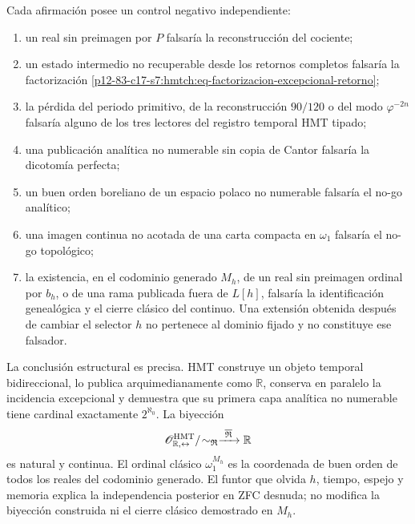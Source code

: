\begin{proposition}[Falsadores]
\label{p12-83-c19-s1:hmtch:prop-falsadores}
Cada afirmación posee un control negativo independiente:
\begin{enumerate}
 \item un real sin preimagen por \(P\) falsaría la reconstrucción del
       cociente;
 \item un estado intermedio no recuperable desde los retornos completos
       falsaría la factorización
       \eqref{p12-83-c17-s7:hmtch:eq-factorizacion-excepcional-retorno};
 \item la pérdida del periodo primitivo, de la reconstrucción \(90/120\) o
       del modo \(\varphi^{-2n}\) falsaría alguno de los tres lectores del
       registro temporal HMT tipado;
 \item una publicación analítica no numerable sin copia de Cantor falsaría
       la dicotomía perfecta;
 \item un buen orden boreliano de un espacio polaco no numerable falsaría el
       no-go analítico;
 \item una imagen continua no acotada de una carta compacta en \(\omega_1\)
       falsaría el no-go topológico;
 \item la existencia, en el codominio generado \(M_h\), de un real sin
       preimagen ordinal por \(b_h\), o de una rama publicada fuera de
       \(L[h]\), falsaría la identificación genealógica y el cierre clásico
       del continuo. Una extensión obtenida después de cambiar el selector
       \(h\) no pertenece al dominio fijado y no constituye ese falsador.
\end{enumerate}
\end{proposition}

La conclusión estructural es precisa. HMT construye un objeto temporal
bidireccional, lo publica arquimedianamente como \(\mathbb R\), conserva en
paralelo la incidencia excepcional y demuestra que su primera capa analítica
no numerable tiene cardinal exactamente \(2^{\aleph_0}\). La biyección
\[
 \mathscr O_{\mathbb R,\leftrightarrow}^{\rm HMT}/\!
 \sim_{\mathfrak R}
 \xrightarrow{\ \overline{\mathfrak R}\ }\mathbb R
\]
es natural y continua. El ordinal clásico \(\omega_1^{M_h}\) es la coordenada
de buen orden de todos los reales del codominio generado. El funtor que
olvida \(h\), tiempo, espejo y memoria explica la independencia posterior en
ZFC desnuda; no modifica la biyección construida ni el cierre clásico
demostrado en \(M_h\).
